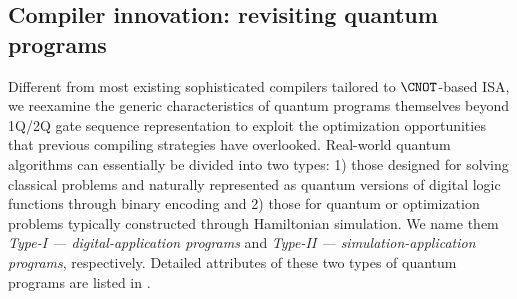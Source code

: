 
\subsection{Compiler innovation: revisiting quantum programs} 




Different from most existing sophisticated compilers tailored to $\CNOT$-based ISA, we reexamine the generic characteristics of quantum programs themselves beyond 1Q/2Q gate sequence representation to exploit the optimization opportunities that previous compiling strategies have overlooked. Real-world quantum algorithms can essentially be divided into two types: 1) those designed for solving classical problems and naturally represented as quantum versions of digital logic functions through binary encoding and 2) those for quantum or optimization problems typically constructed through Hamiltonian simulation. We name them \textit{Type-I --- digital-application programs} and \textit{Type-II --- simulation-application programs}, respectively. Detailed attributes of these two types of quantum programs are listed in .


\begin{table}[tbp]
    \centering
    \caption{Quantum program categorization.}
    \label{tab:programs}
\end{table}



